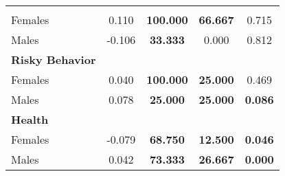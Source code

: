 \begin{tabular}{l c c c c}
{\midrule
\textbf{Crime} & & & & \\
\quad Females &      0.110 & \textbf{  100.000} & \textbf{   66.667} &  0.715 \\
\quad Males &     -0.106 & \textbf{   33.333} &     0.000 &   0.812 \\
\midrule
\textbf{Risky Behavior} & & & & \\
\quad Females &      0.040 & \textbf{  100.000} & \textbf{   25.000} & 0.469 \\
\quad Males &      0.078 & \textbf{   25.000} & \textbf{   25.000} &  \textbf{ 0.086} \\
\midrule
\textbf{Health} & & & & \\
\quad Females &     -0.079 & \textbf{   68.750} & \textbf{   12.500} &  \textbf{ 0.046} \\
\quad Males &      0.042 & \textbf{   73.333} & \textbf{   26.667} &  \textbf{ 0.000} \\
\bottomrule
\end{tabular}

